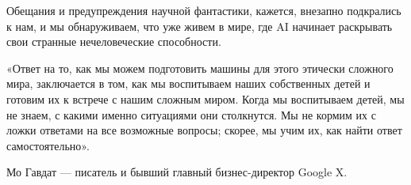 Обещания и предупреждения научной фантастики, кажется, внезапно подкрались к нам, и мы обнаруживаем, что уже живем в мире, где AI начинает раскрывать свои странные нечеловеческие способности.

\begin{fancyquotes}
    «Ответ на то, как мы можем подготовить машины для этого этически сложного мира, заключается в том, как мы воспитываем наших собственных детей и готовим их к встрече с нашим сложным миром. Когда мы воспитываем детей, мы не знаем, с какими именно ситуациями они столкнутся. Мы не кормим их с ложки ответами на все возможные вопросы; скорее, мы учим их, как найти ответ самостоятельно».\\

    \begin{flushright}
        Мо Гавдат — писатель и бывший главный бизнес-директор Google X.
    \end{flushright}
\end{fancyquotes}




